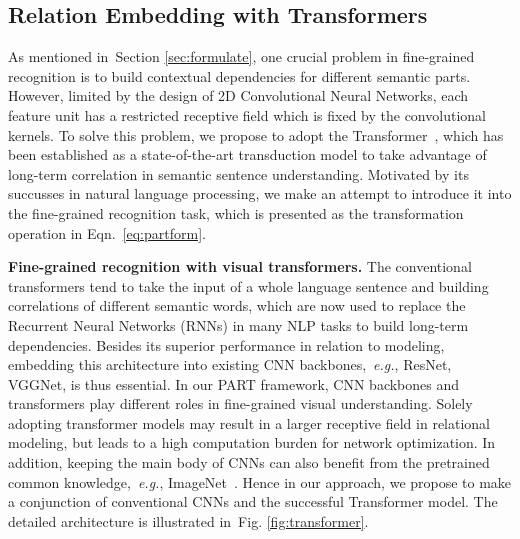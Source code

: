 \documentclass[journal]{IEEEtran}
\def\eg{{\em e.g.}}
\newcommand{\figref}[1]{Fig. \ref{#1}}
\newcommand{\secref}[1]{Section \ref{#1}}
\begin{document}
\subsection{Relation Embedding with Transformers}\label{sec:relationembed}
As mentioned in~\secref{sec:formulate}, one crucial problem in fine-grained recognition is to build contextual dependencies for different semantic parts.
However, limited by the design of 2D Convolutional Neural Networks, each feature unit has a restricted receptive field which is fixed by the convolutional kernels. To solve this problem, we propose to adopt the Transformer~\cite{vaswani2017attention}, which has been established as a state-of-the-art transduction model to take advantage of long-term correlation in semantic sentence understanding. Motivated by its succusses in natural language processing, we make an attempt to introduce it into the fine-grained recognition task, which is presented as the transformation operation in Eqn.~\eqref{eq:partform}.

\textbf{Fine-grained recognition with visual transformers.} The conventional transformers tend to take the input of a whole language sentence and building correlations of different semantic words, which are now used to replace the Recurrent Neural Networks (RNNs) in many NLP tasks to build long-term dependencies. Besides its superior performance in relation to modeling, embedding this architecture into existing CNN backbones,~\eg, ResNet, VGGNet, is thus essential. In our PART framework, CNN backbones and transformers play different roles in fine-grained visual understanding. Solely adopting transformer models may result in a larger receptive field in relational modeling, but leads to a high computation burden for network optimization. In addition, keeping the main body of CNNs can also benefit from the pretrained common knowledge,~\eg, ImageNet~\cite{deng2009imagenet}. Hence in our approach, we propose to make a conjunction of conventional CNNs and the successful Transformer model. The detailed architecture is illustrated in~\figref{fig:transformer}.
\end{document}

